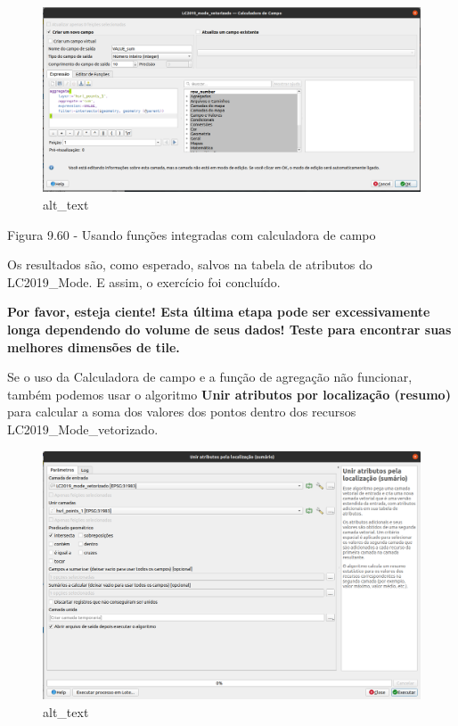 \documentclass[
  portuguese,
]{krantz}
\begin{document}
\begin{figure}
\centering
\includegraphics{media/modulo9/fig960.png}
\caption{alt\_text}
\end{figure}

Figura 9.60 - Usando funções integradas com calculadora de campo

Os resultados são, como esperado, salvos na tabela de atributos do LC2019\_Mode. E assim, o exercício foi concluído.

\textbf{Por favor, esteja ciente! Esta última etapa pode ser excessivamente longa dependendo do volume de seus dados! Teste para encontrar suas melhores dimensões de tile.}

Se o uso da Calculadora de campo e a função de agregação não funcionar, também podemos usar o algoritmo \textbf{Unir atributos por localização (resumo)} para calcular a soma dos valores dos pontos dentro dos recursos LC2019\_Mode\_vetorizado.

\begin{figure}
\centering
\includegraphics{media/modulo9/fig961.png}
\caption{alt\_text}
\end{figure}
\end{document}
